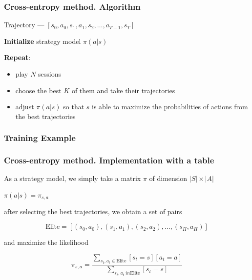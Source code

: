 \documentclass[fullscreen=true, bookmarks=true, hyperref={pdfencoding=unicode}]{beamer}
\begin{document}
\begin{frame}
  \frametitle{Cross-entropy method. Algorithm}

    Trajectory — $\left[s_0, a_0, s_1, a_1, s_2, \dots , a_{T-1}, s_T \right]$

   \vspace{1cm}
   {\bf Initialize} strategy model $\pi(a | s)$

   \vspace{1cm}
   {\bf Repeat}:
   \begin{itemize}
     \item play $N$ sessions
     \item choose the best $K$ of them and take their trajectories
     \item adjust $\pi(a | s)$ so that $s$ is able to maximize the probabilities of actions from the best trajectories
   \end{itemize}
\end{frame}


\begin{frame}
  \frametitle{Training Example}

  \begin{center}
  \end{center}
\end{frame}


\begin{frame}
  \frametitle{Cross-entropy method. Implementation with a table}

    As a strategy model, we simply take a matrix $\pi$ of dimension $|S| \times |A|$

   $\pi(a | s) = \pi_{s,a}$

   after selecting the best trajectories, we obtain a set of pairs

   $$\text{Elite} = [(s_0, a_0), (s_1, a_1), (s_2, a_2), \dots, (s_H, a_H )]$$

   and maximize the likelihood

   $$ \pi_{s,a} = \frac{\sum\limits_{s_t, a_t \in \text{Elite}} [s_t = s][a_t = a]}{\sum\limits_{s_t, a_t \ in \text{Elite}} [s_t = s]}$$
\end{frame}
\end{document}
